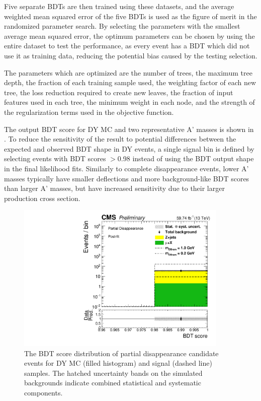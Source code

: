 Five separate BDTs are then trained using these datasets, and the average weighted mean squared error of the five BDTs is used as the figure of merit in the randomized parameter search.
By selecting the parameters with the smallest average mean squared error, the optimum parameters can be chosen by using the entire dataset to test the performance, as every event has a BDT which did not use it as training data, reducing the potential bias caused by the testing selection.

The parameters which are optimized are the number of trees, the maximum tree depth, the fraction of each training sample used, the weighting factor of each new tree, the loss reduction required to create new leaves, the fraction of input features used in each tree, the minimum weight in each node, and the strength of the regularization terms used in the objective function.

The output BDT score for DY MC and two representative A' masses is shown in . 
To reduce the sensitivity of the result to potential differences between the expected and observed BDT shape in DY events, a single signal bin is defined by selecting events with BDT scores $>$0.98 instead of using the BDT output shape in the final likelihood fits.
Similarly to complete disappearance events, lower A' masses typically have smaller deflections and more background-like BDT scores than larger A' masses, but have increased sensitivity due to their larger \dbrem production cross section.

\begin{figure}[htbp]
	\centering
	\includegraphics[width=0.9\textwidth]{figures/BDTscore_DYandSignal.pdf}
	\caption[Partial Disappearance BDT Output for DY and Signal]{The BDT score distribution of partial disappearance candidate events for DY MC (filled histogram) and signal (dashed line) samples. The hatched uncertainty bands on the simulated backgrounds indicate combined statistical and systematic components.}
        \label{fig:BDToutput}
\end{figure}

